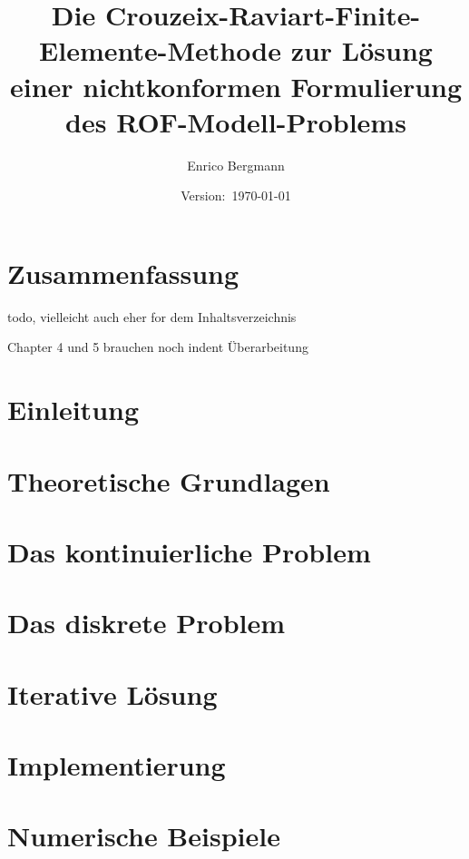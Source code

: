 \documentclass[draft=false,twoside,11pt]{scrreprt}
\title{Die Crouzeix-Raviart-Finite-Elemente-Methode zur Lösung einer
nichtkonformen Formulierung des ROF-Modell-Problems}
\author{Enrico Bergmann}
\date{Version:~\today}
\begin{document}
\maketitle
\tableofcontents

\chapter*{Zusammenfassung}
todo, vielleicht auch eher for dem Inhaltsverzeichnis

Chapter 4 und 5 brauchen noch indent Überarbeitung



\chapter{Einleitung}
\label{chap:introduction}


\chapter{Theoretische Grundlagen}
\label{chap:theoreticalBasics}


\chapter{Das kontinuierliche Problem}
\label{chap:continuousProblem}


\chapter{Das diskrete Problem}
\label{chap:discreteProblem}


\chapter{Iterative Lösung}
\label{chap:algorithm}


\chapter{Implementierung}
\label{chap:implementation}


\chapter{Numerische Beispiele}
\label{chap:experiments}

\end{document}
